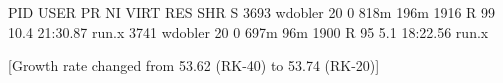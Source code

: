 \documentclass[\mydriver,12pt,twoside,notitlepage]{article}
\newcommand{\BoxLabel}[1]{\fbox{\rmfamily\emph{#1}}}
\begin{document}
{\small\color{DarkBlue}
\begin{CodeVerbatim}[label=\BoxLabel{top}]
   PID USER      PR  NI  VIRT  RES  SHR S %
  3693 wdobler   20   0  818m 196m 1916 R   99 10.4  21:30.87 run.x              
  3741 wdobler   20   0  697m  96m 1900 R   95  5.1  18:22.56 run.x              
\end{CodeVerbatim}
}


[Growth rate changed from 53.62 (RK-40) to 53.74 (RK-20)]
\end{document}
